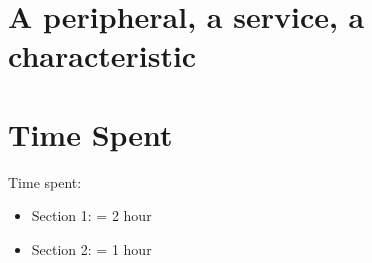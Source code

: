 \documentclass{lab}
\begin{document}
\section{A peripheral, a service, a characteristic}

\section{Time Spent} 

Time spent:

\begin{itemize}
  \item Section 1: = 2 hour
  \item Section 2: = 1 hour
\end{itemize}
\end{document}
